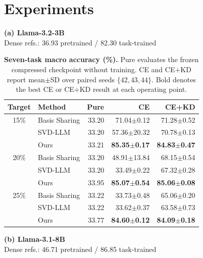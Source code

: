 \documentclass{article}
\begin{document}
\section{Experiments}
\label{sec:experiments}
%

\begin{table}[t]
\centering
\caption{\textbf{Seven-task macro accuracy (\%).}
Pure evaluates the frozen compressed checkpoint without training.
CE and CE+KD report mean$\pm$SD over paired seeds $\{42,43,44\}$.
Bold denotes the best CE or CE+KD result at each operating point.}
\label{tab:main}

\vspace{1.8mm}

\setlength{\tabcolsep}{2.15pt}
\renewcommand{\arraystretch}{1.02}

\begin{minipage}[t]{0.485\textwidth}
\centering
\textbf{(a) Llama-3.2-3B}\\[0.4mm]
{\footnotesize Dense refs.: 36.93 pretrained / 82.30 task-trained}\\[0.7mm]

\begin{tabular}{@{}c l r r r@{}}
\toprule
Target & Method & Pure & CE & CE+KD \\
\midrule
15\%
& Basis Sharing & 33.20 & 71.04$\pm$0.12 & 71.28$\pm$0.52 \\
& SVD-LLM       & 33.20 & 57.36$\pm$20.32 & 70.78$\pm$0.13 \\
& Ours          & 33.21 & \textbf{85.35$\pm$0.17}
                         & \textbf{84.83$\pm$0.47} \\

\addlinespace[1.2pt]

20\%
& Basis Sharing & 33.20 & 48.91$\pm$13.84 & 68.15$\pm$0.54 \\
& SVD-LLM       & 33.20 & 33.49$\pm$0.22 & 67.32$\pm$0.28 \\
& Ours          & 33.95 & \textbf{85.07$\pm$0.54}
                         & \textbf{85.06$\pm$0.08} \\

\addlinespace[1.2pt]

25\%
& Basis Sharing & 33.22 & 33.73$\pm$0.48 & 65.06$\pm$0.20 \\
& SVD-LLM       & 33.22 & 33.62$\pm$0.37 & 63.58$\pm$0.73 \\
& Ours          & 33.77 & \textbf{84.60$\pm$0.12}
                         & \textbf{84.09$\pm$0.18} \\
\bottomrule
\end{tabular}
\end{minipage}
%
\hfill
%
\begin{minipage}[t]{0.485\textwidth}
\centering
\textbf{(b) Llama-3.1-8B}\\[0.4mm]
{\footnotesize Dense refs.: 46.71 pretrained / 86.85 task-trained}\\[0.7mm]


\end{minipage}
\end{table}
\end{document}
